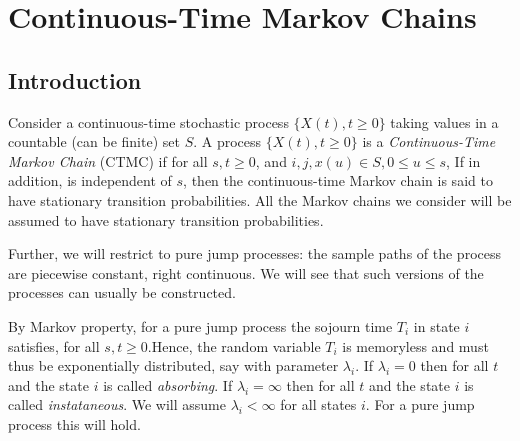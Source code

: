 \documentclass[all-lectures.tex]{subfiles}
\begin{document}

\chapter{Continuous-Time Markov Chains}
\setcounter{section}{0}
\setcounter{subsection}{0}

\section*{}
\chr
\section{Introduction}
Consider a continuous-time stochastic process $\{X(t),t\ge0\}$ taking values in a countable (can be finite) set $S$.
A process $\{X(t),t\ge0\}$ is a \textit{Continuous-Time Markov Chain} (CTMC) if for all $s,t \ge 0$, and $i,j,x(u) \in S, 0\le u\le s$,
If in addition,
is independent of $s$, then the continuous-time Markov chain is said to have stationary transition probabilities. 
All the Markov chains we consider will be assumed to have stationary transition probabilities.

Further, we will restrict to pure jump processes: the sample paths of the process are piecewise constant, right continuous. We will see that such versions of the processes can usually be constructed.

By Markov property, for a pure jump process the sojourn time $T_i$ in state $i$ satisfies,
for all $s,t \ge 0$.Hence, the random variable $T_i$ is memoryless and must thus be exponentially distributed, say with parameter $\lambda_i$.
If $\lambda_i = 0$ then
for all $t$ and the state $i$ is called \textit{absorbing}.
If $\lambda_i = \infty$ then
for all $t$ and the state $i$ is called \textit{instataneous}. We will assume $\lambda_i < \infty$ for all states $i$. For a pure jump process this will hold.
\end{document}
